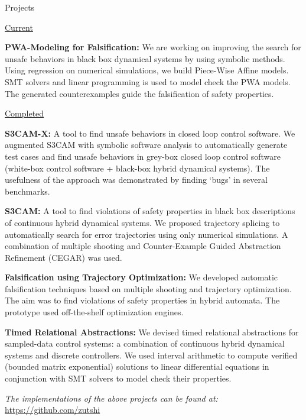 \documentclass{resume} %
\begin{document}
\begin{rSection}{ Projects}

\begin{rSubsection}{\vspace{0.2cm}\hspace{-0.1in}\underline{Current}}{}{}{}
\vspace{0.2cm}
\item
	\textbf{PWA-Modeling for Falsification:} We are working on improving the search for unsafe behaviors in black box dynamical systems by using symbolic methods. Using regression on numerical simulations, we build Piece-Wise Affine models. SMT solvers and linear programming is used to model check the PWA models. The generated counterexamples guide the falsification of safety properties.
\end{rSubsection}
\begin{rSubsection}{\vspace{-0.2cm}\hspace{-0.1in}\underline{Completed}}{}{}{}
\vspace{0.2cm}
  \setlength\itemsep{1em}
\item
	\textbf{S3CAM-X:} A tool to find unsafe behaviors in closed loop control software. We augmented S3CAM with symbolic software analysis to automatically generate test cases and find unsafe behaviors in grey-box closed loop control software (white-box control software + black-box hybrid dynamical systems). The usefulness of the approach was demonstrated by finding `bugs' in several benchmarks.
\item
	\textbf{S3CAM:} A tool to find violations of safety properties in black box descriptions of continuous hybrid dynamical systems. We proposed trajectory splicing to automatically search for error trajectories using only numerical simulations. A combination of multiple shooting and Counter-Example Guided Abstraction Refinement (CEGAR) was used.
\item
	\textbf{Falsification using Trajectory Optimization:} We developed automatic falsification techniques based on multiple shooting and trajectory optimization. The aim was to find violations of safety properties in hybrid automata. The prototype used off-the-shelf optimization engines.
\item
     \textbf{Timed Relational Abstractions:} We devised timed relational abstractions for sampled-data control systems: a combination of continuous hybrid dynamical systems and discrete controllers. We used interval arithmetic to compute verified (bounded matrix exponential) solutions to linear differential equations in conjunction with SMT solvers to model check their properties.
\end{rSubsection}
\vspace{-0.2cm}
\textit{The implementations of the above projects can be found at:} \url{https://github.com/zutshi}

\end{rSection}
\end{document}
